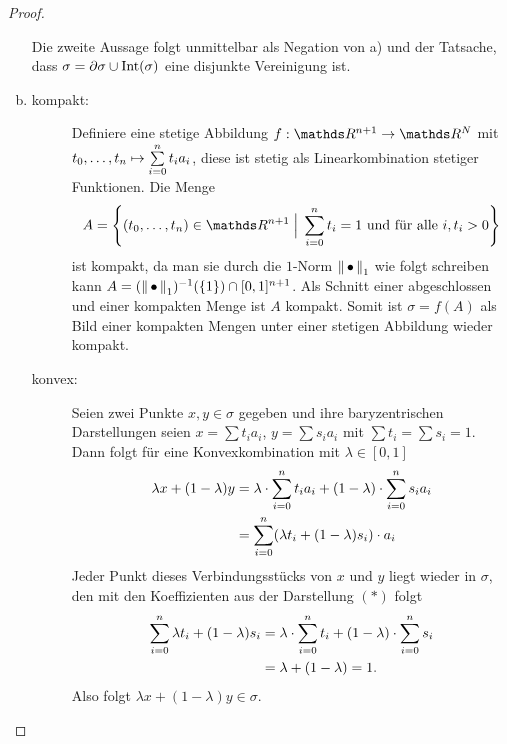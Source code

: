 \begin{Satz}
\begin{proof}
\begin{enumerate}[(a):]
      Die zweite Aussage folgt unmittelbar als Negation von a) und der
      Tatsache, dass $\sigma = \partial\sigma \cup \Int(\sigma)$ eine
      disjunkte Vereinigung ist.

    \item 
      \begin{description}
      \item[kompakt:] Definiere eine stetige Abbildung
        $f : \R^{n+1} \rightarrow \R^N$ mit
        $ t_0,\ldots ,t_n \mapsto \sp{0}{n} t_i a_i$, diese ist stetig
        als Linearkombination stetiger Funktionen.  Die Menge
        \begin{gather*}
          A= \set{ (t_0,\ldots,t_n) \in \R^{n+1}}{ \sp{0}{n} t_i = 1
            \text{ und für alle } i , t_i > 0}
        \end{gather*}
        ist kompakt, da man sie durch die $1$-Norm $\nn_1$ wie folgt
        schreiben kann $A = (\nn_1)^{-1}(\{ 1 \}) \cap
        [0,1]^{n+1}$.
        Als Schnitt einer abgeschlossen und einer kompakten Menge ist
        $A$ kompakt.  Somit ist $\sigma = f(A)$ als Bild einer
        kompakten Mengen unter einer stetigen Abbildung wieder
        kompakt.
      \item[konvex:] Seien zwei Punkte $x,y \in \sigma$ gegeben und
        ihre baryzentrischen Darstellungen seien $x = \sum t_i a_i$,
        $y = \sum s_i a_i$ mit $\sum t_i = \sum s_i = 1$. Dann folgt
        für eine Konvexkombination mit $\lambda \in [0,1]$
        \renewcommand*{\theequation}{$*$}
        \begin{align}
          \nonumber
          \lambda x + (1- \lambda)y &= \lambda \cdot \sp{0}{n} t_i a_i%
                                      + (1-\lambda) \cdot \sp{0}{n} s_i a_i \\
                                    &= \sp{0}{n} (\lambda t_i +%
                                      (1-\lambda) s_i) \cdot a_i  
        \end{align}
        Jeder Punkt dieses Verbindungsstücks von $x$ und $y$ liegt
        wieder in $\sigma$, den mit den Koeffizienten aus der
        Darstellung $(*)$ folgt
        \begin{align*}
          \sp{0}{n} \lambda t_i + (1-\lambda) s_i 
          &= \lambda \cdot \sp{0}{n} t_i + (1-\lambda) \cdot \sp{0}{n} s_i \\
          &= \lambda + (1 - \lambda) = 1.
        \end{align*}
        Also folgt $\lambda x + (1- \lambda)y \in \sigma$.  


\end{description}
\end{enumerate}
\end{proof}
\end{Satz}
